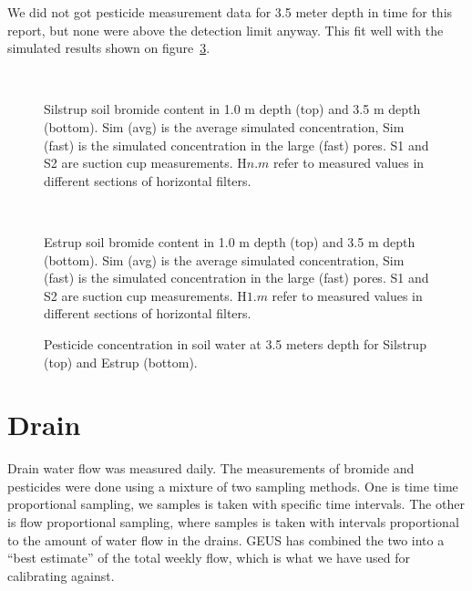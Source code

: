 We did not got pesticide measurement data for 3.5 meter depth in time
for this report, but none were above the detection limit anyway.  This
fit well with the simulated results shown on
figure~\ref{fig:pest-horizontal}.

\begin{figure}[htbp]
  \begin{center}
    \\
  \end{center}
  \caption{Silstrup soil bromide content in 1.0 m depth (top) and 3.5
    m depth (bottom).  Sim (avg) is the average simulated
    concentration, Sim (fast) is the simulated concentration in the
    large (fast) pores.  S1 and S2 are suction cup measurements.
    H$n$.$m$ refer to measured values in different sections of
    horizontal filters.}
  \label{fig:Silstrup-bromide}
\end{figure}

\begin{figure}[htbp]
  \begin{center}
    \\
  \end{center}
  \caption{Estrup soil bromide content in 1.0 m depth (top) and 3.5
    m depth (bottom).  Sim (avg) is the average simulated
    concentration, Sim (fast) is the simulated concentration in the
    large (fast) pores.  S1 and S2 are suction cup measurements.
    H$1$.$m$ refer to measured values in different sections of
    horizontal filters.}
  \label{fig:Estrup-bromide}
\end{figure}

\begin{figure}[htbp]
  \begin{center}
  \end{center}
  \caption{Pesticide concentration in soil water at 3.5 meters depth
    for Silstrup (top) and Estrup (bottom).}
  \label{fig:pest-horizontal}
\end{figure}

\FloatBarrier
\section{Drain}

Drain water flow was measured daily.  The measurements of bromide and
pesticides were done using a mixture of two sampling methods.  One is
time time proportional sampling, we samples is taken with specific
time intervals.  The other is flow proportional sampling, where
samples is taken with intervals proportional to the amount of water
flow in the drains.  GEUS has combined the two into a ``best
estimate'' of the total weekly flow, which is what we have used for
calibrating against.

